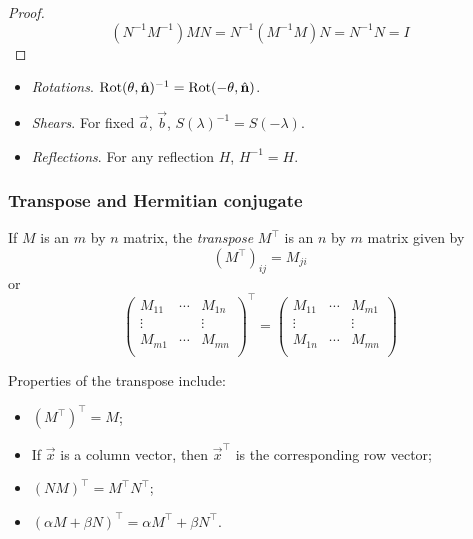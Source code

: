 \documentclass{../../template/note}
\begin{document}
    \begin{proof}
        \[
            (N^{-1}M^{-1})MN = N^{-1}(M^{-1}M)N = N^{-1}N = I
        \]
    \end{proof}
    
    \begin{example}
        \begin{itemize}
            \item \emph{Rotations}. \(\Rot(\theta, \hvec n)^{-1} = \Rot(-\theta, \hvec n)\).
            \item \emph{Shears}. For fixed \(\vec a\), \(\vec b\), \(S(\lambda)^{-1} = S(-\lambda)\).
            \item \emph{Reflections}. For any reflection \(H\), \(H^{-1} = H\).
        \end{itemize}
    \end{example}
    
    \subsubsection{Transpose and Hermitian conjugate}

    \begin{definition}
        If \(M\) is an \(m\) by \(n\) matrix, the \emph{transpose} \(M^\intercal\) is an \(n\) by \(m\) matrix given by
        \[
            (M^\intercal)_{ij} = M_{ji}
        \]
        or
        \[
            \begin{pmatrix}
             M_{11} & \cdots & M_{1n} \\
             \vdots &  & \vdots \\
             M_{m1} & \cdots & M_{mn} \\
            \end{pmatrix}^\intercal =
            \begin{pmatrix}
             M_{11} & \cdots & M_{m1} \\
             \vdots &  & \vdots \\
             M_{1n} & \cdots & M_{mn} \\
            \end{pmatrix}
        \]
    \end{definition}
    
    Properties of the transpose include:

    \begin{itemize}
        \item \((M^\intercal)^\intercal = M\); 
        \item If \(\vec x\) is a column vector, then \(\vec x^\intercal\) is the corresponding row vector;
        \item \((NM)^\intercal = M^\intercal N^\intercal\);
        \item \((\alpha M + \beta N)^\intercal = \alpha M^\intercal + \beta N^\intercal\).
    \end{itemize}
    
\end{document}
